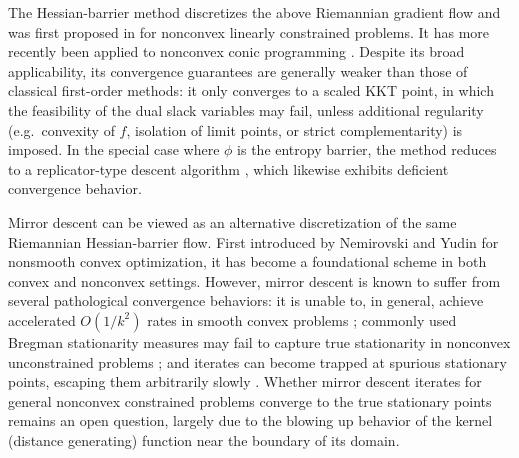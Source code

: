 \documentclass[11pt]{article}
\begin{document}
The Hessian-barrier method discretizes the above Riemannian gradient flow and was first proposed in \cite{bomze2019hessian} for nonconvex linearly constrained problems. It has more recently been applied to nonconvex conic programming \cite{dvurechensky2025hessian}.  Despite its broad applicability, its convergence guarantees are generally weaker than those of classical first-order methods: it only converges to a scaled KKT point, in which the feasibility of the dual slack variables may fail, unless additional regularity (e.g.\ convexity of \(f\), isolation of limit points, or strict complementarity) is imposed.  In the special case where \(\phi\) is the entropy barrier, the method reduces to a replicator-type descent algorithm \cite{tseng2011first}, which likewise exhibits deficient convergence behavior.

Mirror descent can be viewed as an alternative discretization of the same Riemannian Hessian-barrier flow.  First introduced by Nemirovski and Yudin \cite{nemirovskij1983problem} for nonsmooth convex optimization, it has become a foundational scheme in both convex \cite{benamou2015iterative,bauschke2017descent,dragomir2021quartic,dragomir2021fast,yang2022bregman,chu2023efficient,khoo2025bregman} and nonconvex \cite{bolte2018first,mukkamala2019bregman,ding2023nonconvex,zhang2024stochastic,ding2024stochastic} settings.  However, mirror descent is known to suffer from several pathological convergence behaviors: it is unable to, in general, achieve accelerated \(O(1/k^2)\) rates in smooth convex problems \cite{dragomir2021optimal}; commonly used Bregman stationarity measures may fail to capture true stationarity in nonconvex unconstrained problems \cite{zhang2024stochastic}; and iterates can become trapped at spurious stationary points, escaping them arbitrarily slowly \cite{chen2024spurious}.  Whether mirror descent iterates for general nonconvex constrained problems converge to the true stationary points remains an {open question}, largely due to the blowing up behavior of the kernel (distance generating) function near the boundary of its domain.
\end{document}
